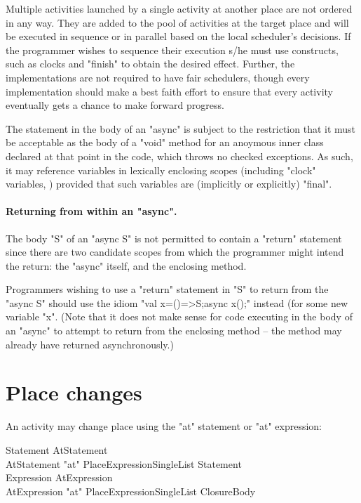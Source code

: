 Multiple activities launched by a single activity at another place are
not ordered in any way. They are added to the pool of activities at
the target place and will be executed in sequence or in parallel based
on the local scheduler's decisions. If the programmer wishes to
sequence their execution s/he must use \Xten{} constructs, such as
clocks and \xcd"finish" to obtain the desired effect.  Further, the
\Xten{} implementations are not required to have fair schedulers,
though every implementation should make a best faith effort to ensure
that every activity eventually gets a chance to make forward progress.

\begin{staticrule*}
The statement in the body of an \xcd"async" is subject to the
restriction that it must be acceptable as the body of a \xcd"void"
method for an anoymous inner class declared at that point in the code,
which throws no checked exceptions. As such, it may reference
variables in lexically enclosing scopes (including \xcd"clock"
variables, ) provided that such variables are
(implicitly or explicitly) \xcd"final".
\end{staticrule*}

\paragraph{Returning from within an \xcd"async".}
The body \xcd"S" of an  \xcd"async S" is not permitted to contain a 
\xcd"return" statement since there are two candidate scopes from which
the programmer might intend the return: the   
\xcd"async" itself, and the enclosing method.

Programmers wishing to use a \xcd"return" statement in \xcd"S" to
return from the \xcd"async S" should use the idiom 
\xcd"val x=()=>S;async x();" instead (for some new variable \xcd"x". 
(Note that it does not make sense for code executing in the body of an
\xcd"async" to attempt to return from the enclosing method -- the
method may already have returned asynchronously.)


\section{Place changes}\label{AtStatement}

An activity may change place using the \xcd"at" statement or
\xcd"at" expression:

\begin{grammar}
Statement \: AtStatement \\
AtStatement \: \xcd"at" PlaceExpressionSingleList Statement \\
Expression \: AtExpression \\
AtExpression \: \xcd"at" PlaceExpressionSingleList ClosureBody \\
\end{grammar}


